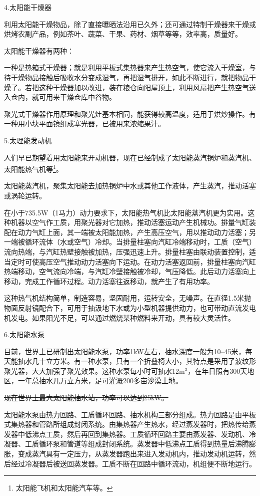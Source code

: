 \documentclass{ctexbook}
\begin{document}
4.太阳能干燥器

利用太阳能干燥物品，除了直接曝晒法沿用已久外；还可通过特制干燥器来干燥或烘烤农副产品，例如茶叶、蔬菜、干果、药材、烟草等等，效率高，质量好。

太阳能干燥器有两种：

一种是热箱式干燥器；就是利用平板式集热器来产生热空气，使它流入干燥室，与待干燥物品接触后吸收水分变成湿气，再把湿气排开，如此不断进行，就把物品干燥了。若把这种干燥器加以改进，装在粮仓向阳屋顶上，利用风扇把产生热空气送入仓内，就可用来干燥仓库中谷物。

聚光式干燥器作用原理和聚光灶基本相同，能获得较高温度，适用于烘炒操作。有一种用小块平面镜组成塞光器，已被用来浓缩果汁。

5.太理能发动机

人们早已期望着用太阳能来开动机器，现在已经制成了太阳能蒸汽锅炉和蒸汽机、太阳能热气机等\footnote{太阳能飞机和太阳能汽车等。}。

太阳能蒸汽机，聚集太阳能去加热锅炉中水或其他工作液体，产生蒸汽，推动活塞或涡轮运转。

在小于735.5W（1马力）动力要求下，太阳能热气机比太阳能蒸汽机更为实用。这种机器以空气作工质，用聚光器对它加热，推动活塞运动产生机械功。排量气缸装配在动力气缸上面，其一端被太阳能加热，产生高压空气，用以推动动力活塞；另一端被循环流体（水或空气）冷却。当排量柱塞向汽缸冷端移动时，工质（空气）流向热端，与汽缸热壁接触被加热，压强迅速上升。排量柱塞由联动装置控制，适当定时可使高压空气推动动力活塞向下运动。在动力活塞返回前，排量柱塞向汽缸热端移动，空气流向冷端，与汽缸冷壁接触被冷却，气压降低。此后动力活塞向上移动，完成工作循环过程。动力活塞往返移动，就产生了有用功率。

这种热气机结构简单，制造容易，坚固耐用，运转安全，无噪声。在直径1.5米抛物面反射镜配合下，可用于抽汲地下水或为小型机器提供动力，也可带动直流发电机发电。如果阳光不足，可以通过燃烧某种燃料来开动，具有较大灵活性。	

6.太阳能水泵

目前，世界上已研制出太阳能水泵，功率1kW左右，抽水深度一般为10--45米，每天能抽水几十立方米。有一种水泵，只有一个折叠椅大小，其特点是采用了波纹形聚光器，大大加强了聚光效果。这种水泵每小时可抽水12m$^{3}$，在年日照有300天地区，一年总抽水几万立方米，足可灌溉200多亩沙漠土地。

\sout{现在世界上最大太阳能抽水站，功率可以达到25kW。}

太阳能水泵由热力回路、工质循环回路、抽水机构三部分组成。热力回路是由平板式集热器和管路所组成封闭系统。由集热器产生热水，经过蒸发器时，把热传给蒸发器中低沸点工质，然后再回到集热器。工质循环回路主要由蒸发器、发动机、冷凝器、工质循环泵和管道等组成封闭系统。蒸发器中低沸点工质得到热量后沸腾膨胀，变成蒸汽具有一定压力，从蒸发器跑出来进入发动机内，推动发动机运转，然后经过冷凝器后被送回蒸发器。工质不断在回路中循环流动，机组便不断地运行。
\end{document}
